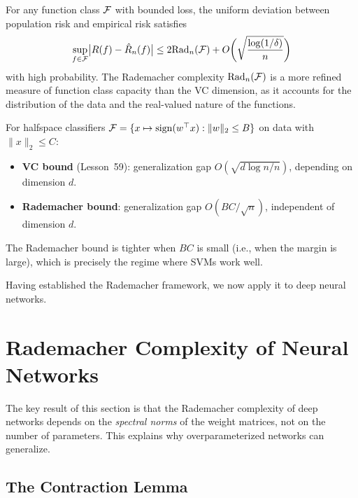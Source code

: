 \documentclass[11pt,a4paper]{article}
\begin{document}
\begin{keyresult}[title={Rademacher Generalization Bound}]
For any function class $\mathcal{F}$ with bounded loss, the uniform
deviation between population risk and empirical risk satisfies
\[
  \sup_{f \in \mathcal{F}} \bigl| R(f) - \hat{R}_n(f) \bigr|
  \le 2 \mathrm{Rad}_n(\mathcal{F}) + O\biggl(\sqrt{\frac{\log(1/\delta)}{n}}
  \biggr)
\]
with high probability.  The Rademacher complexity $\mathrm{Rad}_n(\mathcal{F})$
is a more refined measure of function class capacity than the VC
dimension, as it accounts for the distribution of the data and the
real-valued nature of the functions.
\end{keyresult}

\begin{example}
\label{ex:rad-vs-vc}
For halfspace classifiers $\mathcal{F} = \{x \mapsto \operatorname{sign}(w^\top x) :
\|w\|_2 \le B\}$ on data with $\|x\|_2 \le C$:
\begin{itemize}[nosep]
  \item \textbf{VC bound} (Lesson~59): generalization gap
    $O(\sqrt{d \log n / n})$, depending on dimension $d$.
  \item \textbf{Rademacher bound}: generalization gap
    $O(BC / \sqrt{n})$, independent of dimension $d$.
\end{itemize}
The Rademacher bound is tighter when $BC$ is small (i.e., when
the margin is large), which is precisely the regime where SVMs
work well.
\end{example}

Having established the Rademacher framework, we now apply it to
deep neural networks.

\section{Rademacher Complexity of Neural Networks}
\label{sec:rad-nn}

The key result of this section is that the Rademacher complexity
of deep networks depends on the \emph{spectral norms} of the weight
matrices, not on the number of parameters.  This explains why
overparameterized networks can generalize.

\subsection{The Contraction Lemma}
\end{document}
